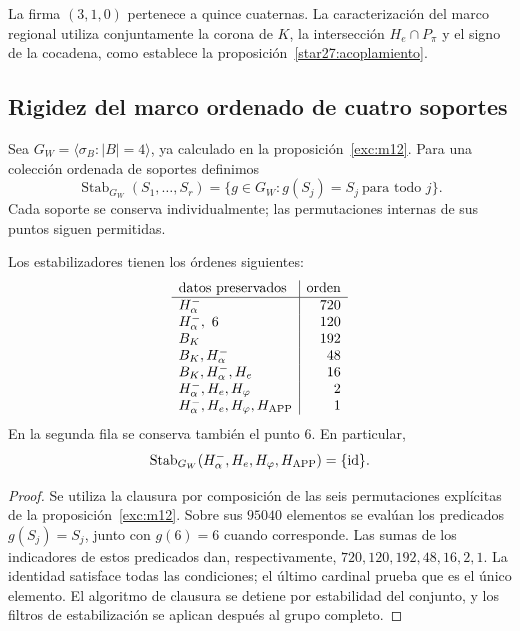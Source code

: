 La firma \((3,1,0)\) pertenece a quince cuaternas. La
caracterización del marco regional utiliza conjuntamente la corona
de \(K\), la intersección \(H_e\cap P_\pi\) y el signo de la
cocadena, como establece la proposición~\ref{star27:acoplamiento}.

\subsection{Rigidez del marco ordenado de cuatro soportes}
\label{star27:rigidez}

Sea \(G_W=\langle\sigma_B:|B|=4\rangle\), ya calculado en la
proposición~\ref{exc:m12}. Para una colección ordenada de soportes
definimos
\[
\operatorname{Stab}_{G_W}(S_1,\ldots,S_r)
=\{g\in G_W:g(S_j)=S_j\ \text{para todo }j\}.
\]
Cada soporte se conserva individualmente; las permutaciones internas
de sus puntos siguen permitidas.

\begin{theorem}
\label{star27:marco}
Los estabilizadores tienen los órdenes siguientes:
\[
\begin{array}{l|r}
\text{datos preservados}&\text{orden}\\ \hline
H^-_\alpha&720\\
H^-_\alpha,\ 6&120\\
B_K&192\\
B_K,H^-_\alpha&48\\
B_K,H^-_\alpha,H_e&16\\
H^-_\alpha,H_e,H_\varphi&2\\
H^-_\alpha,H_e,H_\varphi,H_{\rm APP}&1
\end{array}
\]
En la segunda fila se conserva también el punto \(6\).
En particular,
\[
\operatorname{Stab}_{G_W}
(H^-_\alpha,H_e,H_\varphi,H_{\rm APP})=\{\operatorname{id}\}.
\]
\end{theorem}

\begin{proof}
Se utiliza la clausura por composición de las seis permutaciones
explícitas de la proposición~\ref{exc:m12}. Sobre sus \(95040\)
elementos se evalúan los predicados \(g(S_j)=S_j\), junto con
\(g(6)=6\) cuando corresponde. Las sumas de los indicadores de
estos predicados dan, respectivamente,
\(720,120,192,48,16,2,1\). La identidad satisface todas las
condiciones; el último cardinal prueba que es el único elemento.
El algoritmo de clausura se detiene por estabilidad del conjunto,
y los filtros de estabilización se aplican después al grupo completo.
\end{proof}

